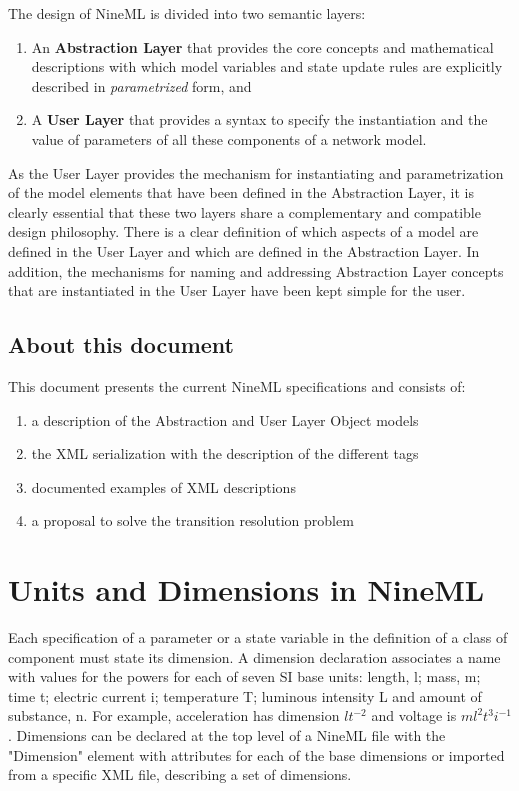 \documentclass{article}
\begin{document}
The design of NineML is divided into two semantic layers:
\begin {enumerate}
\item An {\bf Abstraction Layer} that provides the core concepts and
mathematical descriptions with which model variables and state update
rules are explicitly described in {\em parametrized} form, and
\item A {\bf User Layer} that provides a syntax to specify the
instantiation and the value of parameters of all these components of a network
model.
\end {enumerate}

As the User Layer provides the mechanism for instantiating and
parametrization of the model elements that have been defined in the
Abstraction Layer, it is clearly essential that these two layers share
a complementary and compatible design philosophy. There is a
clear definition of which aspects of a model are defined in the User
Layer and which are defined in the Abstraction Layer. In addition,
the mechanisms for naming and addressing Abstraction Layer concepts
that are instantiated in the User Layer have been kept simple for the
user.

\subsection{About this document}

This document presents the current NineML specifications and consists of:
\begin{enumerate}
\item a description of the Abstraction and User Layer Object models
\item the XML serialization with the description of the different tags
\item documented examples of XML descriptions
\item a proposal to solve the transition resolution problem
\end{enumerate}

\section{Units and Dimensions in NineML}
\label{dimensions}

\noindent
Each specification of a parameter or a state variable in the definition of
a class of component must state its dimension. A dimension declaration
associates a name with values for the powers for each of seven SI base
units: length, l; mass, m; time t; electric current i; temperature T;
luminous intensity L and amount of substance, n.
For example, acceleration has dimension $lt^{-2}$ and voltage is
$ml^2t^3i^{-1}$.
Dimensions can be declared at the top level of a NineML file with
the "Dimension" element with attributes for each of the base dimensions or
imported from a specific XML file, describing a set of dimensions.
\end{document}
